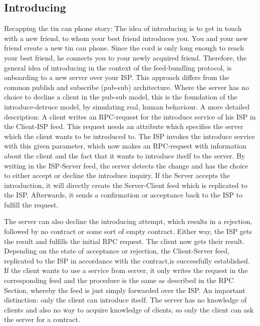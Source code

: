 \subsection{Introducing}
Recapping the tin can phone story: The idea of introducing is to get in touch with a new friend, to whom your best friend introduces you. You and your new friend create a new tin can phone. Since the cord is only long enough to reach your best friend, he connects you to your newly acquired friend. Therefore, the general idea of introducing in the context of the feed-bundling protocol, is onboarding to a new server over your ISP. This approach differs from the common publish and subscribe (pub-sub) architecture. Where the server has no choice to decline a client in the pub-sub model, this is the foundation of the introduce-detruce model, by simulating real, human behaviour. A more detailed description: A client writes an RPC-request for the introduce service of his ISP in the Client-ISP feed. This request needs an attribute which specifies the server which the client wants to be introduced to. The ISP invokes the introduce service with this given parameter, which now makes an RPC-request with information about the client and the fact that it wants to introduce itself to the server. By writing in the ISP-Server feed, the server detects the change and has the choice to either accept or decline the introduce inquiry. If the Server accepts the introduction, it will directly create the Server-Client feed which is replicated to the ISP. Afterwards, it sends a confirmation or acceptance back to the ISP to fulfill the request. 

The server can also decline the introducing attempt, which results in a rejection, followed by no contract or some sort of empty contract. Either way, the ISP gets the result and fulfills the initial RPC request. The client now gets their result. Depending on the state of acceptance or rejection, the Client-Server feed, replicated to the ISP in accordance with the contract,is successfully established. If the client wants to use a service from server, it only writes the request in the corresponding feed and the procedure is the same as described in the RPC Section, whereby the feed is just simply forwarded over the ISP. 
An important distinction: only the client can introduce itself. The server has no knowledge of clients and also no way to acquire knowledge of clients, so only the client can ask the server for a contract.

